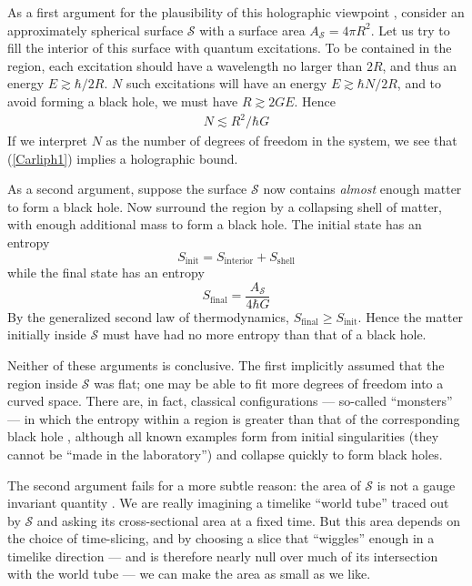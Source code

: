 \documentclass[11pt]{article}
\begin{document}
As a first argument for the plausibility of this holographic viewpoint
\cite{Yurtsever}, consider an approximately spherical surface 
$\mathcal{S}$ with a surface area $A_{\mathcal{S}} = 4\pi R^2$.  
Let us try to fill the interior of this surface with quantum excitations.  
To be contained in the region, each excitation should have a wavelength 
no larger than $2R$, and thus an energy $E\gtrsim \hbar/2R$.  $N$ such
excitations will have an energy $E\gtrsim \hbar N/2R$, and to avoid 
forming a black hole, we must have $R\gtrsim 2GE$.  Hence
\begin{align}
N \lesssim R^2/\hbar G
\label{Carliph1}
\end{align}
If we interpret $N$ as the number of degrees of freedom in the 
system, we see that (\ref{Carliph1}) implies a holographic bound.

As a second argument, suppose the surface $\mathcal{S}$ now
contains \emph{almost} enough matter to form a black hole.
Now surround the region by a collapsing shell of matter, with 
enough additional mass to form a black hole.  The initial state has 
an entropy
$$S_{\scriptscriptstyle\mathrm{init}} = S_{\scriptscriptstyle\mathrm{interior}}
  + S_{\scriptscriptstyle\mathrm{shell}}$$
while the final state has an entropy
$$S_{\scriptscriptstyle\mathrm{final}} = \frac{A_{\mathcal S}}{4\hbar G}$$
By the generalized second law of thermodynamics, 
$S_{\scriptscriptstyle\mathrm{final}}
\ge S_{\scriptscriptstyle\mathrm{init}}$.  Hence the matter initially
inside $\mathcal{S}$ must have had no more entropy than 
that of a black hole.

Neither of these arguments is conclusive.  The first implicitly
assumed that the region inside $\mathcal{S}$ was flat; one may be 
able to fit more degrees of freedom into a curved space. There are, in fact, 
classical configurations --- so-called ``monsters'' 
--- in which the entropy within a region is greater than that of the 
corresponding black hole \cite{Hsu}, although all known examples 
form from initial singularities (they cannot be ``made in the laboratory'') 
and collapse quickly to form black holes.   

The second argument fails for a more subtle reason: the area of
$\mathcal{S}$ is not a gauge invariant quantity \cite{Flanagan,Bousso}.  
We are really imagining a timelike ``world tube'' traced 
out by $\mathcal{S}$ and asking its cross-sectional area at a fixed 
time.  But this area depends on the choice of time-slicing, and by 
choosing a slice that ``wiggles'' enough in a timelike direction --- 
and is therefore nearly null over much of its intersection with the 
world tube --- we can make the area as small as we like.
\end{document}
